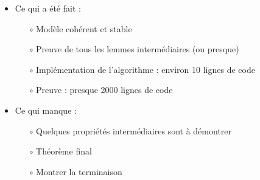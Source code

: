 \documentclass{beamer}
\theoremstyle{definition}
\begin{document}
\begin{frame}
    \begin{itemize}
        \item Ce qui a été fait :
        \begin{itemize}
          \item[$\circ$] Modèle cohérent et stable
          \item[$\circ$] Preuve de tous les lemmes intermédiaires (ou presque)
          \item[$\circ$] Implémentation de l'algorithme : environ 10 lignes de code
          \item[$\circ$] Preuve : presque 2000 lignes de code
        \end{itemize}
        \vfill
        \item Ce qui manque :
        \begin{itemize}
          \item[$\circ$] Quelques propriétés intermédiaires sont à démontrer
          \item[$\circ$] Théorème final
          \item[$\circ$] Montrer la terminaison
        \end{itemize}
    \end{itemize}
\end{frame}
\end{document}
